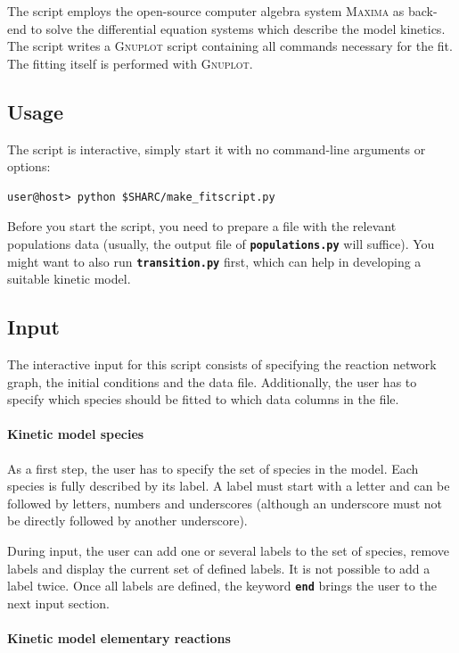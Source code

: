 \documentclass[a4paper,11pt,DIV=15,openany,twoside=false]{scrbook}
\newcommand{\ttt}[1]{\textbf{\texttt{#1}}}
\begin{document}
The script employs the open-source computer algebra system \textsc{Maxima} as back-end to solve the differential equation systems which describe the model kinetics.
The script writes a \textsc{Gnuplot} script containing all commands necessary for the fit. 
The fitting itself is performed with \textsc{Gnuplot}.

\subsection{Usage}

The script is interactive, simply start it with no command-line arguments or options:
\begin{verbatim}
user@host> python $SHARC/make_fitscript.py
\end{verbatim}

Before you start the script, you need to prepare a file with the relevant populations data (usually, the output file of \ttt{populations.py} will suffice).
You might want to also run \ttt{transition.py} first, which can help in developing a suitable kinetic model.

\subsection{Input}

The interactive input for this script consists of specifying the reaction network graph, the initial conditions and the data file.
Additionally, the user has to specify which species should be fitted to which data columns in the file.

\paragraph{Kinetic model species}

As a first step, the user has to specify the set of species in the model.
Each species is fully described by its label.
A label must start with a letter and can be followed by letters, numbers and underscores (although an underscore must not be directly followed by another underscore).

During input, the user can add one or several labels to the set of species, remove labels and display the current set of defined labels.
It is not possible to add a label twice.
Once all labels are defined, the keyword \ttt{end} brings the user to the next input section.

\paragraph{Kinetic model elementary reactions}
\end{document}

